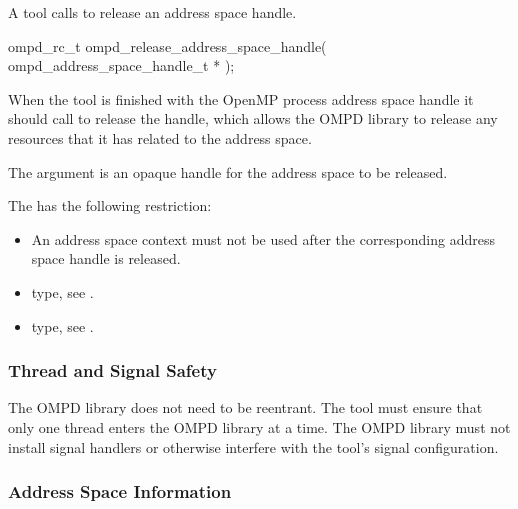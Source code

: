 \label{subsubsubsec:ompd_release_address_space_handle}

\summary
A tool calls  to release an address space
handle.

\format
\begin{cspecific}
\begin{ompSyntax}
ompd_rc_t ompd_release_address_space_handle(
  ompd_address_space_handle_t *
);
\end{ompSyntax}
\end{cspecific}

\descr
When the tool is finished with the OpenMP process address space handle it
should call  to release the handle, 
which allows the OMPD library to release any resources that it has related 
to the address space.

\argdesc
The  argument is an opaque handle for the address space to be released.

\restrictions
The  has the following restriction:

\begin{itemize}
\item An address space context must not be used after the corresponding 
      address space handle is released.
\end{itemize}

\crossreferences
\begin{itemize}
\item {} type, 
see .

\item {} type, see .
\end{itemize}



\subsubsection{Thread and Signal Safety}

The OMPD library does not need to be reentrant. The tool must ensure that only 
one thread enters the OMPD library at a time. The OMPD library must not install 
signal handlers or otherwise interfere with the tool's signal configuration.



\subsubsection{Address Space Information}

